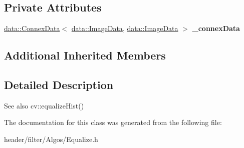 \subsection*{Private Attributes}
\begin{DoxyCompactItemize}
\item 
\mbox{\label{classfilter_1_1algos_1_1_equalize_a32bb5b9588251a938a086fd8d08e820c}} 
\hyperlink{classfilter_1_1data_1_1_connex_data}{data\+::\+Connex\+Data}$<$ \hyperlink{classfilter_1_1data_1_1_image_data}{data\+::\+Image\+Data}, \hyperlink{classfilter_1_1data_1_1_image_data}{data\+::\+Image\+Data} $>$ {\bfseries \+\_\+connex\+Data}
\end{DoxyCompactItemize}
\subsection*{Additional Inherited Members}


\subsection{Detailed Description}
\begin{DoxySeeAlso}{See also}
cv\+::equalize\+Hist() 
\end{DoxySeeAlso}


The documentation for this class was generated from the following file\+:\begin{DoxyCompactItemize}
\item 
header/filter/\+Algos/Equalize.\+h\end{DoxyCompactItemize}
